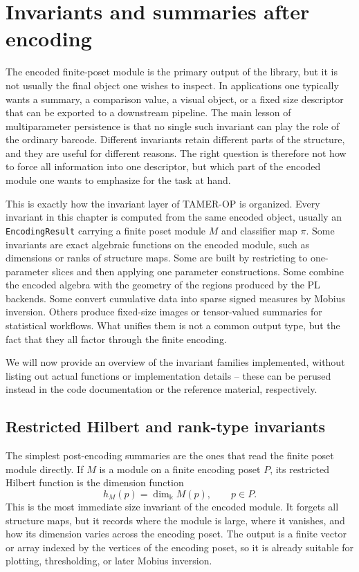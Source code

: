 \documentclass[11pt]{article}
\newcommand{\kk}{\Bbbk}
\newcommand{\TAMER}{\textsc{TAMER-OP}}
\theoremstyle{definition}
\theoremstyle{remark}
\begin{document}
\section{Invariants and summaries after encoding}\label{sec:invariants}

The encoded finite-poset module is the primary output of the library, but it is not usually the final object one wishes to inspect.  In applications one typically wants a summary, a comparison value, a visual object, or a fixed size descriptor that can be exported to a downstream pipeline.  The main lesson of multiparameter persistence is that no single such invariant can play the role of the ordinary barcode.  Different invariants retain different parts of the structure, and they are useful for different reasons.  The right question is therefore not how to force all information into one descriptor, but which part of the encoded module one wants to emphasize for the task at hand.

This is exactly how the invariant layer of \TAMER{} is organized.  Every invariant in this chapter is computed from the same encoded object, usually an \texttt{EncodingResult} carrying a finite poset module $M$ and classifier map $\pi$.  Some invariants are exact algebraic functions on the encoded module, such as dimensions or ranks of structure maps.  Some are built by restricting to one-parameter slices and then applying one parameter constructions.  Some combine the encoded algebra with the geometry of the regions produced by the PL backends.  Some convert cumulative data into sparse signed measures by Mobius inversion.  Others produce fixed-size images or tensor-valued summaries for statistical workflows.  What unifies them is not a common output type, but the fact that they all factor through the finite encoding.

We will now provide an overview of the invariant families implemented, without listing out actual functions or implementation details -- these can be perused instead in the code documentation or the reference material, respectively.

\subsection{Restricted Hilbert and rank-type invariants}

The simplest post-encoding summaries are the ones that read the finite poset module directly.  If $M$ is a module on a finite encoding poset $P$, its restricted Hilbert function is the dimension function
\[
h_M(p)=\dim_{\kk} M(p),\qquad p\in P.
\]
This is the most immediate size invariant of the encoded module.  It forgets all structure maps, but it records where the module is large, where it vanishes, and how its dimension varies across the encoding poset. The output is a finite vector or array indexed by the vertices of the encoding poset, so it is already suitable for plotting, thresholding, or later Mobius inversion.
\end{document}
